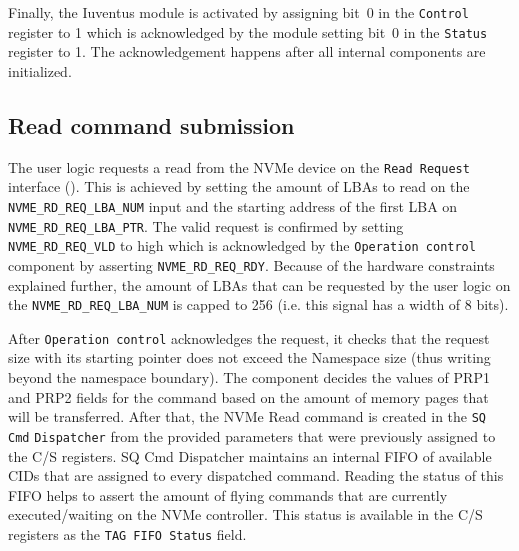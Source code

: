 Finally, the Iuventus module is activated by assigning bit~0 in the \verb|Control| register to 1
which is acknowledged by the module setting bit~0 in the \verb|Status| register to 1. The
acknowledgement happens after all internal components are initialized.

\subsection{Read command submission}

The user logic requests a read from the NVMe device on the \verb|Read Request| interface
(). This is achieved by setting the amount of LBAs to read on the
\verb|NVME_RD_REQ_LBA_NUM| input and the starting address of the first LBA on
\verb|NVME_RD_REQ_LBA_PTR|. The valid request is confirmed by setting \verb|NVME_RD_REQ_VLD| to high
which is acknowledged by the \verb|Operation control| component by asserting \verb|NVME_RD_REQ_RDY|.
Because of the hardware constraints explained further, the amount of LBAs that can be requested by
the user logic on the \verb|NVME_RD_REQ_LBA_NUM| is capped to 256 (i.e. this signal has a width of 8
bits).

After \verb|Operation control| acknowledges the request, it checks that the request size with its
starting pointer does not exceed the Namespace size (thus writing beyond the namespace boundary). The
component decides the values of \ac{PRP1} and \ac{PRP2} fields for the command based on the amount
of memory pages that will be transferred. After that, the NVMe Read command is created in the
\verb|SQ| \verb|Cmd| \verb|Dispatcher| from the provided parameters that were previously assigned to the \ac{C/S}
registers. SQ Cmd Dispatcher maintains an internal FIFO of available \acp{CID} that are assigned to
every dispatched command. Reading the status of this FIFO helps to assert the amount of flying
commands that are currently executed/waiting on the NVMe controller. This status is available in the
\ac{C/S} registers as the \verb|TAG FIFO Status| field.

